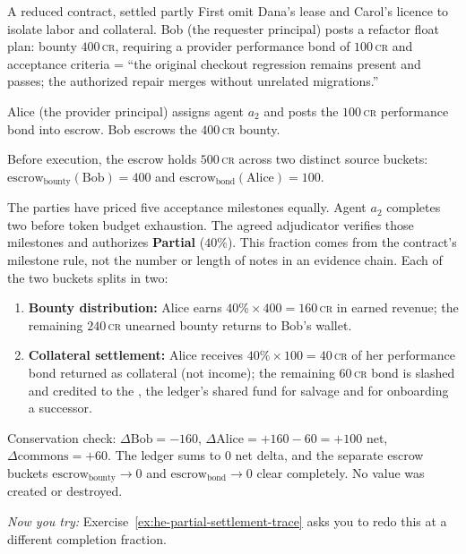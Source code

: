 \documentclass[11pt,a4paper]{article}
\theoremstyle{definition}
\theoremstyle{definition}
\theoremstyle{remark}
\begin{document}
\begin{pdexample}{A reduced contract, settled partly}
\setlength{\parskip}{4pt plus 1pt}
First omit Dana's lease and Carol's licence to isolate labor and collateral.
Bob (the requester principal) posts a refactor float plan: bounty $400$\,\textsc{cr}, requiring a provider performance bond of $100$\,\textsc{cr} and acceptance criteria = ``the original checkout regression remains present and passes; the authorized repair merges without unrelated migrations.''

Alice (the provider principal) assigns agent $a_2$ and posts the $100$\,\textsc{cr} performance bond into escrow. Bob escrows the $400$\,\textsc{cr} bounty.

Before execution, the escrow holds $500$\,\textsc{cr} across two distinct source buckets: $\text{escrow}_{\text{bounty}}(\text{Bob}) = 400$ and $\text{escrow}_{\text{bond}}(\text{Alice}) = 100$.

The parties have priced five acceptance milestones equally. Agent $a_2$
completes two before token budget exhaustion. The agreed adjudicator verifies
those milestones and authorizes \textbf{Partial} ($40\%$). This fraction comes
from the contract's milestone rule, not the number or length of notes in an
evidence chain. Each of the two buckets splits in two:
\begin{enumerate}[nosep]
  \item \textbf{Bounty distribution:} Alice earns $40\% \times 400 = 160$\,\textsc{cr} in earned revenue; the remaining $240$\,\textsc{cr} unearned bounty returns to Bob's wallet.
  \item \textbf{Collateral settlement:} Alice receives $40\% \times 100 = 40$\,\textsc{cr} of her performance bond returned as collateral (not income); the remaining $60$\,\textsc{cr} bond is slashed and credited to the , the ledger's shared fund for salvage and for onboarding a successor.
\end{enumerate}

Conservation check: $\Delta \text{Bob} = -160$, $\Delta \text{Alice} = +160 - 60 = +100$ net, $\Delta \text{commons} = +60$. The ledger sums to $0$ net delta, and the separate escrow buckets $\text{escrow}_{\text{bounty}} \to 0$ and $\text{escrow}_{\text{bond}} \to 0$ clear completely. No value was created or destroyed.

\emph{Now you try:} Exercise~\ref{ex:he-partial-settlement-trace} asks you to redo this at a different completion fraction.


\end{pdexample}
\end{document}
